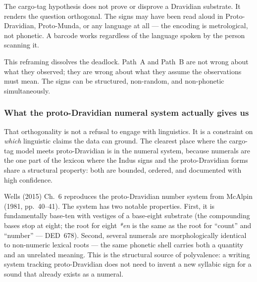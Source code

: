 The cargo-tag hypothesis does not prove or disprove a Dravidian
substrate. It renders the question orthogonal. The signs may have
been read aloud in Proto-Dravidian, Proto-Munda, or any language
at all --- the encoding is metrological, not phonetic. A barcode
works regardless of the language spoken by the person scanning it.

This reframing dissolves the deadlock. Path~A and Path~B are not
wrong about what they observed; they are wrong about what they
assume the observations must mean. The signs can be structured,
non-random, and non-phonetic simultaneously.

\subsubsection*{What the proto-Dravidian numeral system actually
gives us}

That orthogonality is not a refusal to engage with linguistics. It
is a constraint on \emph{which} linguistic claims the data can
ground. The clearest place where the cargo-tag model meets
proto-Dravidian is in the numeral system, because numerals are the
one part of the lexicon where the Indus signs and the proto-Dravidian
forms share a structural property: both are bounded, ordered, and
documented with high confidence.

Wells (2015) Ch.~6 reproduces the proto-Dravidian number system
from McAlpin (1981, pp.~40--41).\smartcite{Wells2015} The system has
two notable properties.
First, it is fundamentally base-ten with vestiges of a base-eight
substrate (the compounding bases stop at eight; the root for eight
\textit{*en} is the same as the root for ``count'' and
``number'' --- DED~678).
Second, several numerals are morphologically identical to non-numeric
lexical roots --- the same phonetic shell carries both a quantity and
an unrelated meaning. This is the structural source of polyvalence:
a writing system tracking proto-Dravidian does not need to invent a
new syllabic sign for a sound that already exists as a numeral.

